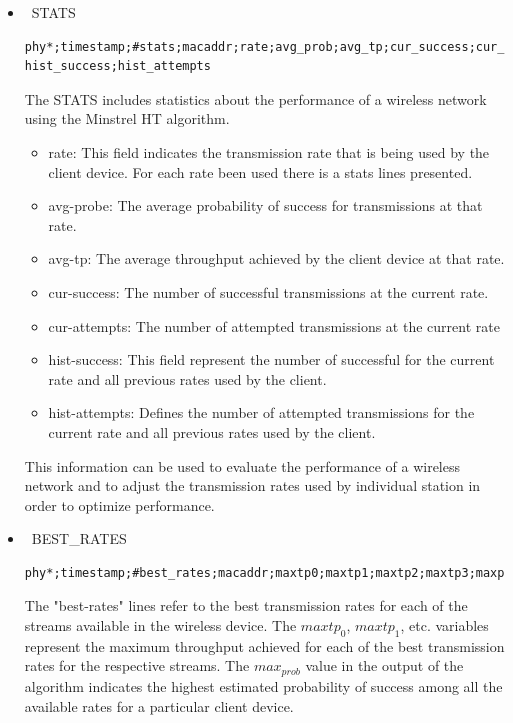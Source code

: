 \begin{sloppypar}
\begin{itemize}
\begin{itemize}
 \end{itemize}

\item \ STATS
\begin{lstlisting}[basicstyle=\small]
phy*;timestamp;#stats;macaddr;rate;avg_prob;avg_tp;cur_success;cur_attempts;
hist_success;hist_attempts
\end{lstlisting}
The STATS includes statistics about the performance of a wireless network using the Minstrel HT algorithm.
 \begin{itemize}
     \item rate: This field indicates the transmission rate that is being used by the client device. For each rate been used there is a stats lines presented. 
     \item avg-probe: The average probability of success for transmissions at that rate.
     \item avg-tp: The average throughput achieved by the client device at that rate.
     \item cur-success: The number of successful transmissions at the current rate.
     \item cur-attempts: The number of attempted transmissions at the current rate
     \item hist-success: This field represent the number of successful for the current rate and all previous rates used by the client.
     \item hist-attempts: Defines the number of attempted transmissions for the current rate and all previous rates used by the client.
 \end{itemize}
This information can be used to evaluate the performance of a wireless network and to adjust the transmission rates used by individual station in order to optimize performance.

\item \ BEST\_RATES
\label{bestrates}
\begin{lstlisting}[basicstyle=\small]
phy*;timestamp;#best_rates;macaddr;maxtp0;maxtp1;maxtp2;maxtp3;maxprob
\end{lstlisting}
The "best-rates" lines refer to the best transmission rates for each of the streams available in the wireless device. The $maxtp_{0}$, $maxtp_{1}$, etc. variables represent the maximum throughput achieved for each of the best transmission rates for the respective streams. The $max_{prob}$ value in the output of the algorithm indicates the highest estimated probability of success among all the available rates for a particular client device.

\end{itemize}
\end{sloppypar}

